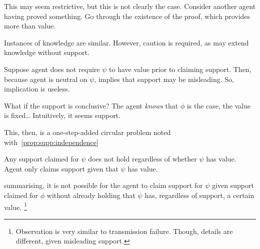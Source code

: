 \begin{note}
  This may seem restrictive, but this is not clearly the case.
  Consider another agent having proved something.
  Go through the existence of the proof, which provides more than value.

  Instances of knowledge are similar.
  However, caution is required, as may extend knowledge without support.



  

  Suppose agent does not require \(\psi\) to have value prior to claiming support.
  Then, because agent is neutral on \(\psi\), implies that support may be misleading.
  So, implication is useless.

  {
    What if the support is conclusive?
    The agent \emph{knows} that \(\phi\) is the case, the value is fixed\dots
    Intuitively, it seems support.
    
  }







  
  
  This, then, is a one-step-added circular problem noted with~\autoref{prop:supp:independence}

  Any support claimed for \(\psi\) does not hold regardless of whether \(\psi\) has value.
  Agent only claims support given that \(\psi\) has value.


  summarising, it is not possible for the agent to claim support for \(\psi\) given support claimed for \(\phi\) without already holding that \(\psi\) has, regardless of support, a certain value.\nolinebreak
  \footnote{
    Observation is very similar to transmission failure.
    Though, details are different, given misleading support.
  }
\end{note}

